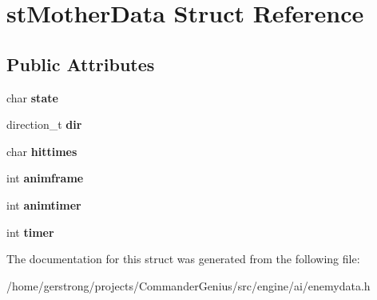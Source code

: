 \hypertarget{structst_mother_data}{
\section{stMotherData Struct Reference}
\label{structst_mother_data}
}
\subsection*{Public Attributes}
\begin{DoxyCompactItemize}
\item 
\hypertarget{structst_mother_data_a239f6eb63a8da811109098883cbbb8ab}{
char {\bfseries state}}
\label{structst_mother_data_a239f6eb63a8da811109098883cbbb8ab}

\item 
\hypertarget{structst_mother_data_a19c7220f60aec0b248d930e9b178011d}{
direction\_\-t {\bfseries dir}}
\label{structst_mother_data_a19c7220f60aec0b248d930e9b178011d}

\item 
\hypertarget{structst_mother_data_a3ea19dbe76aedd1836ad798a7a55c69d}{
char {\bfseries hittimes}}
\label{structst_mother_data_a3ea19dbe76aedd1836ad798a7a55c69d}

\item 
\hypertarget{structst_mother_data_a028d6540464626ce48dffa2a4662ebe9}{
int {\bfseries animframe}}
\label{structst_mother_data_a028d6540464626ce48dffa2a4662ebe9}

\item 
\hypertarget{structst_mother_data_a79a63e6400f9de0cf41961421c9bf409}{
int {\bfseries animtimer}}
\label{structst_mother_data_a79a63e6400f9de0cf41961421c9bf409}

\item 
\hypertarget{structst_mother_data_aa71a6fdb50683fa1d3b5254329dce6c9}{
int {\bfseries timer}}
\label{structst_mother_data_aa71a6fdb50683fa1d3b5254329dce6c9}

\end{DoxyCompactItemize}


The documentation for this struct was generated from the following file:\begin{DoxyCompactItemize}
\item 
/home/gerstrong/projects/CommanderGenius/src/engine/ai/enemydata.h\end{DoxyCompactItemize}
